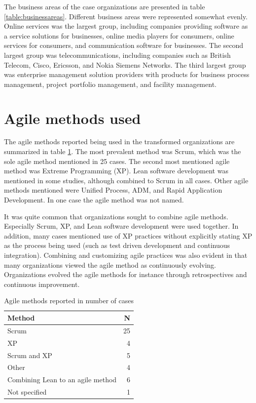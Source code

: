 The business areas of the case organizations are presented in table
\ref{table:businessareas}. Different business areas were represented somewhat
evenly. Online services was the largest group, including companies
providing software as a service solutions for businesses, online media players
for consumers, online services for consumers, and communication software for
businesses. The second largest group was telecommunications, including companies
such as British Telecom, Cisco, Ericsson, and Nokia Siemens Networks. The third
largest group was enterprise management solution providers with products for
business process management, project portfolio management, and facility
management.


\section{Agile methods used}

The agile methods reported being used in the transformed organizations are
summarized in table \ref{table:agilemethods}. The most prevalent method was
Scrum, which was the sole agile method mentioned in 25 cases. The second most
mentioned agile method was Extreme Programming (XP). Lean software development
was mentioned in some studies, although combined to Scrum in all cases. Other
agile methods mentioned were Unified Process, ADM, and Rapid Application
Development. In one case the agile method was not named.

It was quite common that organizations sought to combine agile methods.
Especially Scrum, XP, and Lean software development were used together. In
addition, many cases mentioned use of XP practices without explicitly stating XP
as the process being used (such as test driven development and continuous
integration). Combining and customizing agile practices was also evident in that
many organizations viewed the agile method as continuously evolving.
Organizations evolved the agile methods for instance through retrospectives and
continuous improvement.

\begin{table}[h]
    \centering
    \begin{tabular}{ l r }
        \toprule
        Method                             &  N  \\
        \midrule
        Scrum                              &  25 \\
        XP                                 &  4  \\
        Scrum and XP                       &  5  \\
        Other                              &  4  \\
        Combining Lean to an agile method  &  6  \\
        Not specified                      &  1  \\
        \bottomrule
    \end{tabular}
    \caption{Agile methods reported in number of cases}
    \label{table:agilemethods}
\end{table}


